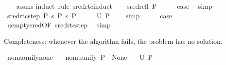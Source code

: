 \begin{isabellebody}
%
\isadelimproof
\ \ %
\endisadelimproof
%
\isatagproof
{}\isamarkupfalse%
\ assms\isanewline
{}\isamarkupfalse%
{\isacharparenleft}{\kern0pt}induct\ rule{\isacharcolon}{\kern0pt}\ sred{\isacharunderscore}{\kern0pt}rtc{\isachardot}{\kern0pt}induct{\isacharparenright}{\kern0pt}\isanewline
\ \ \isamarkupfalse%
\ {\isacharparenleft}{\kern0pt}sred{\isacharunderscore}{\kern0pt}refl\ P{}{\isacharparenright}{\kern0pt}\isanewline
\ \ \isamarkupfalse%
\ \isamarkupfalse%
\ {\isacharquery}{\kern0pt}case\ \isamarkupfalse%
\ simp\isanewline
{}\isamarkupfalse%
\isanewline
\ \ \isamarkupfalse%
\ {\isacharparenleft}{\kern0pt}sred{\isacharunderscore}{\kern0pt}rtc{\isacharunderscore}{\kern0pt}step\ P{}\ s{}\ P{}\ s{}\ P{}{\isacharparenright}{\kern0pt}\isanewline
\ \ \isamarkupfalse%
\ \isamarkupfalse%
\ {\isachardoublequoteopen}U\ P{}\ {\isacharequal}{\kern0pt}\ {\isacharbraceleft}{\kern0pt}{\isacharbraceright}{\kern0pt}{\isachardoublequoteclose}\ \isamarkupfalse%
\ simp\isanewline
\ \ \isamarkupfalse%
\ \isamarkupfalse%
\ {\isacharquery}{\kern0pt}case\ \isamarkupfalse%
\ u{\isacharunderscore}{\kern0pt}empty{\isacharunderscore}{\kern0pt}sred{\isacharbrackleft}{\kern0pt}OF\ sred{\isacharunderscore}{\kern0pt}rtc{\isacharunderscore}{\kern0pt}step{\isacharparenleft}{\kern0pt}{}{\isacharparenright}{\kern0pt}{\isacharbrackright}{\kern0pt}\ \isamarkupfalse%
\ simp\isanewline
{}\isamarkupfalse%
%
\endisatagproof
{\isafoldproof}%
%
\isadelimproof
%
\endisadelimproof
%
\begin{isamarkuptext}%
Completeness: whenever the algorithm fails, the problem has no solution.%
\end{isamarkuptext}\isamarkuptrue%
\isamarkupfalse%
\ nomu{\isacharunderscore}{\kern0pt}unify{\isacharunderscore}{\kern0pt}none{\isacharcolon}{\kern0pt}\isanewline
\ \ \ {\isachardoublequoteopen}nomu{\isacharunderscore}{\kern0pt}unify\ P\ {\isacharequal}{\kern0pt}\ None{\isachardoublequoteclose}\isanewline
\ \ \ {\isachardoublequoteopen}U\ P\ {\isacharequal}{\kern0pt}\ {\isacharbraceleft}{\kern0pt}{\isacharbraceright}{\kern0pt}{\isachardoublequoteclose}\isanewline
%
\isadelimproof

\end{isabellebody}
